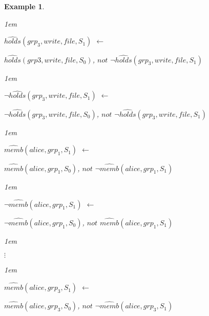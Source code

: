 \documentclass[11pt]{report}
\newtheorem{vexample}{Example}[chapter]
\newenvironment{vquote}
{
  \begin{list}{}{\leftmargin 1em}\item[]
}
{
  \end{list}
}
\begin{document}
\begin{vexample}
\begin{enumerate}
              \begin{vquote}
                $\hat{holds}(grp_3, write, file, S_{1})$ $\leftarrow$

                \hspace{1em}
                $\hat{holds}(grp3, write, file, S_{0})$,
                $not$ $\lnot\hat{holds}(grp_3, write, file, S_{1})$
              \end{vquote}

              \begin{vquote}
                $\lnot\hat{holds}(grp_3, write, file, S_{1})$ $\leftarrow$

                \hspace{1em}
                $\lnot\hat{holds}(grp_3, write, file, S_{0})$,
                $not$ $\lnot\hat{holds}(grp_3, write, file, S_{1})$
              \end{vquote}

              \begin{vquote}
                $\hat{memb}(alice, grp_1, S_{1})$ $\leftarrow$

                \hspace{1em}
                $\hat{memb}(alice, grp_1, S_{0})$,
                $not$ $\lnot\hat{memb}(alice, grp_1, S_{1})$
              \end{vquote}

              \begin{vquote}
                $\lnot \hat{memb}(alice, grp_1, S_{1})$ $\leftarrow$

                \hspace{1em}
                $\lnot\hat{memb}(alice, grp_1, S_{0})$,
                $not$ $\hat{memb}(alice, grp_1, S_{1})$
              \end{vquote}

              \begin{vquote}
                \hspace{2em}$\vdots$
              \end{vquote}

              \begin{vquote}
                $\hat{memb}(alice, grp_3, S_{1})$ $\leftarrow$

                \hspace{1em}
                $\hat{memb}(alice, grp_3, S_{0})$,
                $not$ $\lnot\hat{memb}(alice, grp_3, S_{1})$
              \end{vquote}


\end{enumerate}
\end{vexample}
\end{document}
